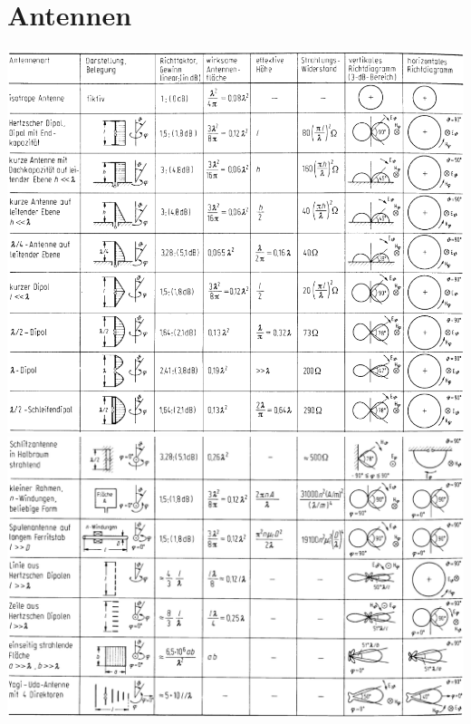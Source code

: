 \section{Antennen}
\begin{minipage}{1.7\columnwidth}
    \includegraphics[width=.55\columnwidth]{Figures/Antennentabelle_1.png}\\
    \includegraphics[width=.55\columnwidth]{Figures/Antennentabelle_2.png}
\end{minipage}